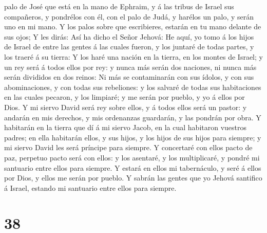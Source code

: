 palo de José que está en la mano de Ephraim, y á las tribus de Israel
sus compañeros, y pondrélos con él, con el palo de Judá, y harélos un
palo, y serán uno en mi mano.  Y los palos sobre que
escribieres, estarán en tu mano delante de sus ojos;  Y les
dirás: Así ha dicho el Señor Jehová: He aquí, yo tomo á los hijos de
Israel de entre las gentes á las cuales fueron, y los juntaré de todas
partes, y los traeré á su tierra:  Y los haré una nación en
la tierra, en los montes de Israel; y un rey será á todos ellos por rey:
y nunca más serán dos naciones, ni nunca más serán divididos en dos
reinos:  Ni más se contaminarán con sus ídolos, y con sus
abominaciones, y con todas sus rebeliones: y los salvaré de todas sus
habitaciones en las cuales pecaron, y los limpiaré; y me serán por
pueblo, y yo á ellos por Dios.  Y mi siervo David será rey
sobre ellos, y á todos ellos será un pastor: y andarán en mis derechos,
y mis ordenanzas guardarán, y las pondrán por obra.  Y
habitarán en la tierra que dí á mi siervo Jacob, en la cual habitaron
vuestros padres; en ella habitarán ellos, y sus hijos, y los hijos de
sus hijos para siempre; y mi siervo David les será príncipe para
siempre.  Y concertaré con ellos pacto de paz, perpetuo
pacto será con ellos: y los asentaré, y los multiplicaré, y pondré mi
santuario entre ellos para siempre.  Y estará en ellos mi
tabernáculo, y seré á ellos por Dios, y ellos me serán por pueblo.
 Y sabrán las gentes que yo Jehová santifico á Israel,
estando mi santuario entre ellos para siempre.

\hypertarget{section-37}{%
\section{38}\label{section-37}}

